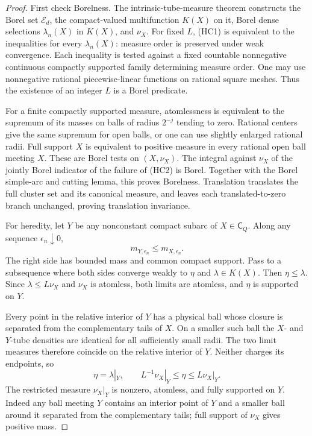 \documentclass[11pt]{article}
\theoremstyle{definition}\newtheorem{definition}[theorem]{Definition}
\theoremstyle{remark}\newtheorem{remark}[theorem]{Remark}
\begin{document}
\begin{proof}
First check Borelness. The intrinsic-tube-measure theorem constructs
the Borel set $\mathcal E_d$, the compact-valued multifunction $K(X)$
on it, Borel dense selections $\lambda_n(X)$ in $K(X)$, and $\nu_X$.
For fixed $L$, (HC1) is equivalent to the inequalities for every
$\lambda_n(X)$: measure order is preserved under weak convergence.
Each inequality is tested against a fixed countable nonnegative
continuous compactly supported family determining measure order.
One may use nonnegative rational piecewise-linear functions on
rational square meshes. Thus the existence of an integer $L$ is
a Borel predicate.

For a finite compactly supported measure, atomlessness is equivalent
to the supremum of its masses on balls of radius $2^{-j}$ tending
to zero. Rational centers give the same supremum for open balls,
or one can use slightly enlarged rational radii. Full support $X$
is equivalent to positive measure in every rational open ball meeting
$X$. These are Borel tests on $(X,\nu_X)$. The integral against
$\nu_X$ of the jointly Borel indicator of the failure of (HC2)
is Borel. Together with the Borel simple-arc and cutting lemma, this
proves Borelness. Translation translates the full cluster set and
its canonical measure, and leaves each translated-to-zero branch
unchanged, proving translation invariance.

For heredity, let $Y$ be any nonconstant compact subarc of
$X\in\mathsf C_Q$. Along any sequence $\epsilon_n\downarrow0$,
\[
       m_{Y,\epsilon_n}\le m_{X,\epsilon_n}.
       \tag{HC4}
\]
The right side has bounded mass and common compact support. Pass to
a subsequence where both sides converge weakly to $\eta$ and
$\lambda\in K(X)$. Then $\eta\le\lambda$. Since
$\lambda\le L\nu_X$ and $\nu_X$ is atomless, both limits are
atomless, and $\eta$ is supported on $Y$.

Every point in the relative interior of $Y$ has a physical ball
whose closure is separated from the complementary tails of $X$.
On a smaller such ball the $X$- and $Y$-tube densities are identical
for all sufficiently small radii. The two limit measures therefore
coincide on the relative interior of $Y$. Neither charges its
endpoints, so
\[
   \eta=\lambda|_Y,\qquad
   L^{-1}\nu_X|_Y\le\eta\le L\nu_X|_Y.
   \tag{HC5}
\]
The restricted measure $\nu_X|_Y$ is nonzero, atomless, and fully
supported on $Y$. Indeed any ball meeting $Y$ contains an interior
point of $Y$ and a smaller ball around it separated from the
complementary tails; full support of $\nu_X$ gives positive mass.


\end{proof}
\end{document}
